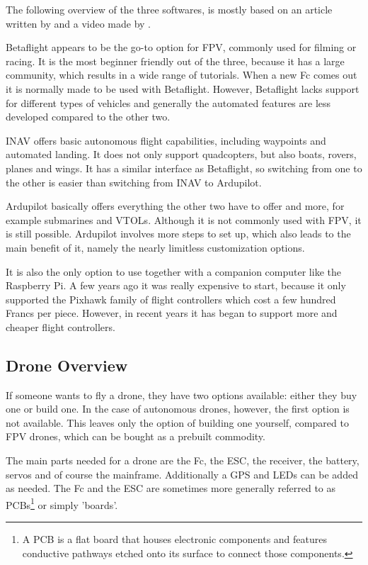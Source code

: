 \documentclass[svgnames]{article}
\begin{document}
	The following overview of the three softwares, is mostly based on an article written by \textcite{firmwarearticle} and a video made by \textcite{firmwarevideo}.
	
	Betaflight appears to be the go-to option for \gls{FPV}, commonly used for filming or racing. It is the most beginner friendly out of the three, because it has a large community, which results in a wide range of tutorials. When a new \gls{Fc} comes out it is normally made to be used with Betaflight. However, Betaflight lacks support for different types of vehicles and generally the automated features are less developed compared to the other two. 
	
	\gls{INAV} offers basic autonomous flight capabilities, including waypoints and automated landing. It does not only support quadcopters, but also boats, rovers, planes and wings. It has a similar interface as Betaflight, so switching from one to the other is easier than switching from \gls{INAV} to Ardupilot.
	
	Ardupilot basically offers everything the other two have to offer and more, for example submarines and \glspl{VTOL}. Although it is not commonly used with \gls{FPV}, it is still possible. Ardupilot involves more steps to set up, which also leads to the main benefit of it, namely the nearly limitless customization options.

	
	It is also the only option to use together with a companion computer like the Raspberry Pi. A few years ago it was really expensive to start, because it only supported the Pixhawk family of flight controllers which cost a few hundred Francs per piece. However, in recent years it has began to support more and cheaper flight controllers.
	


	\subsection{Drone Overview}
	If someone wants to fly a drone, they have two options available: either they buy one or build one. In the case of autonomous drones, however, the first option is not available. This leaves only the option of building one yourself, compared to \gls{FPV} drones, which can be bought as a prebuilt commodity. 
	
	The main parts needed for a drone are the \gls{Fc}, the \gls{ESC}, the receiver, the battery, servos and of course the mainframe. Additionally a \gls{GPS} and LEDs can be added as needed. The \gls{Fc} and the \gls{ESC} are sometimes more generally referred to as \glspl{PCB}\footnote{A \gls{PCB} is a flat board that houses electronic components and features conductive pathways etched onto its surface to connect those components.} or simply 'boards'.
\end{document}
